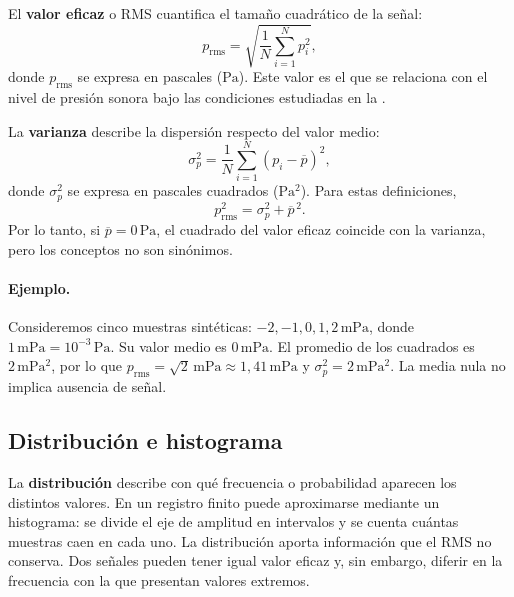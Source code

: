 El \textbf{valor eficaz} o RMS cuantifica el tamaño cuadrático de la señal:
\begin{equation}
    p_{\mathrm{rms}}=
    \sqrt{\frac{1}{N}\sum_{i=1}^{N}p_i^2},
    \label{eq:u10-rms}
\end{equation}
donde \(p_{\mathrm{rms}}\) se expresa en pascales (\(\mathrm{Pa}\)). Este valor
es el que se relaciona con el nivel de presión sonora bajo las condiciones
estudiadas en la .

La \textbf{varianza} describe la dispersión respecto del valor medio:
\begin{equation}
    \sigma_p^2=
    \frac{1}{N}\sum_{i=1}^{N}\left(p_i-\overline{p}\right)^2,
    \label{eq:u10-varianza}
\end{equation}
donde \(\sigma_p^2\) se expresa en pascales cuadrados
(\(\mathrm{Pa^2}\)). Para estas definiciones,
\begin{equation}
    p_{\mathrm{rms}}^2=\sigma_p^2+\overline{p}^{\,2}.
    \label{eq:u10-identidad-estadistica}
\end{equation}
Por lo tanto, si \(\overline{p}=0\,\mathrm{Pa}\), el cuadrado del valor eficaz
coincide con la varianza, pero los conceptos no son sinónimos.

\paragraph{Ejemplo.}
Consideremos cinco muestras sintéticas:
\(-2,-1,0,1,2\,\mathrm{mPa}\), donde
\(1\,\mathrm{mPa}=10^{-3}\,\mathrm{Pa}\). Su valor medio es
\(0\,\mathrm{mPa}\). El promedio de los cuadrados es
\(2\,\mathrm{mPa^2}\), por lo que
\(p_{\mathrm{rms}}=\sqrt{2}\,\mathrm{mPa}\approx1{,}41\,\mathrm{mPa}\) y
\(\sigma_p^2=2\,\mathrm{mPa^2}\). La media nula no implica ausencia de señal.

\subsection{Distribución e histograma}

La \textbf{distribución} describe con qué frecuencia o probabilidad aparecen
los distintos valores. En un registro finito puede aproximarse mediante un
histograma: se divide el eje de amplitud en intervalos y se cuenta cuántas
muestras caen en cada uno. La distribución aporta información que el RMS no
conserva. Dos señales pueden tener igual valor eficaz y, sin embargo, diferir
en la frecuencia con la que presentan valores extremos.

